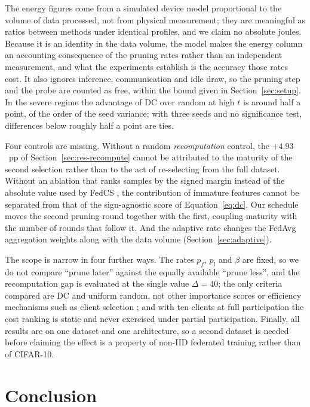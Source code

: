 \documentclass[conference]{IEEEtran}
\begin{document}
The energy figures come from a simulated device model proportional to the volume of
data processed, not from physical measurement; they are meaningful as ratios between
methods under identical profiles, and we claim no absolute joules. Because it is an
identity in the data volume, the model makes the energy column an accounting consequence
of the pruning rates rather than an independent measurement, and what the experiments
establish is the accuracy those rates cost. It also ignores inference, communication
and idle draw, so the pruning step and the probe are counted as free, within the bound
given in Section~\ref{sec:setup}. In the severe
regime the advantage of DC over random at high $t$ is around half a point, of the order
of the seed variance; with three seeds and no significance test, differences below
roughly half a point are ties.

Four controls are missing. Without a random \emph{recomputation} control, the $+4.93$~pp
of Section~\ref{sec:res-recompute} cannot be attributed to the maturity of the second
selection rather than to the act of re-selecting from the full dataset. Without an
ablation that ranks samples by the signed margin instead of the absolute value used by
FedCS \cite{fedcs}, the contribution of immature features cannot be separated from that
of the sign-agnostic score of Equation~\eqref{eq:dc}. Our schedule
moves the second pruning round together with the first, coupling maturity with the
number of rounds that follow it. And the adaptive rate changes the FedAvg aggregation
weights along with the data volume (Section~\ref{sec:adaptive}).

The scope is narrow in four further ways. The rates $p_f$, $p_l$ and $\beta$ are
fixed, so we do not compare ``prune later'' against the equally available ``prune
less'', and the recomputation gap is evaluated at the single value $\Delta = 40$;
the only criteria compared are DC and uniform random, not other importance
scores or efficiency mechanisms such as client selection \cite{criticalfl}; and with
ten clients at full participation the cost ranking is static and never exercised under
partial participation. Finally, all results are on one dataset and one architecture,
so a second dataset is needed before claiming the effect is a property of non-IID
federated training rather than of CIFAR-10.

\section{Conclusion}
\end{document}
